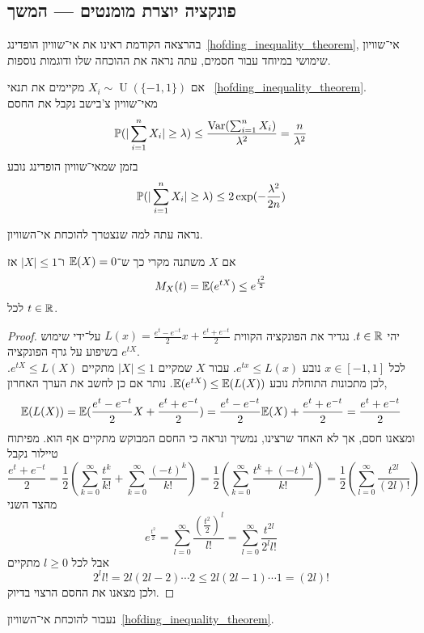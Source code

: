 \subsection{פונקציה יוצרת מומנטים --- המשך}
בהרצאה הקודמת ראינו את אי־שוויון הופדינג\ \ref{hofding_inequality_theorem}, אי־שוויון שימושי במיוחד עבור חסמים, עתה נראה את ההוכחה שלו ודוגמות נוספות.
\begin{example}
	אם $X_i \sim \operatorname{U}(\{-1, 1\})$ מקיימים את תנאי \ \ref{hofding_inequality_theorem}. \\
	מאי־שוויון צ'בישב נקבל את החסם
	\[
		\mathbb{P}(| \sum_{i = 1}^{n} X_i | \ge \lambda)
		\le \frac{\operatorname{Var}(\sum_{i = 1}^{n} X_i)}{\lambda^2}
		= \frac{n}{\lambda^2}
	\]
	בזמן שמאי־שוויון הופדינג נובע
	\[
		\mathbb{P}(| \sum_{i = 1}^{n} X_i | \ge \lambda)
		\le 2 \exp(- \frac{\lambda^2}{2n})
	\]
\end{example}
נראה עתה למה שנצטרך להוכחת אי־השוויון.
\begin{lemma}
	אם $X$ משתנה מקרי כך ש־$\mathbb{E}(X) = 0$ ו־$|X| \le 1$ אז
	\[
		M_X(t)
		= \mathbb{E}(e^{tX})
		\le e^{\frac{t^2}{2}}
	\]
	לכל $t \in \mathbb{R}$.
\end{lemma}
\begin{proof}
	יהי $t \in \mathbb{R}$.
	נגדיר את הפונקציה הקווית $L(x) = \frac{e^t - e^{-t}}{2} x + \frac{e^t + e^{-t}}{2}$ על־ידי שימוש בשיפוע על גרף הפונקציה $e^{tX}$. \\
	לכל $x \in [-1, 1]$ נובע $e^{tx} \le L(x)$.
	עבור $X$ שמקיים $|X| \le 1$ מתקיים $e^{tX} \le L(X)$.
	לכן מתכונות התוחלת נובע $\mathbb{E}(e^{tX}) \le \mathbb{E}(L(X))$.
	נותר אם כן לחשב את הערך האחרון,
	\[
		\mathbb{E}(L(X))
		= \mathbb{E}(\frac{e^t - e^{-t}}{2} X + \frac{e^t + e^{-t}}{2})
		= \frac{e^t - e^{-t}}{2} \mathbb{E}(X) + \frac{e^t + e^{-t}}{2}
		= \frac{e^t + e^{-t}}{2}
	\]
	ומצאנו חסם, אך לא האחד שרצינו, נמשיך ונראה כי החסם המבוקש מתקיים אף הוא.
	מפיתוח טיילור נקבל
	\[
		\frac{e^t + e^{-t}}{2}
		= \frac{1}{2} \left(\sum_{k = 0}^{\infty} \frac{t^k}{k!} + \sum_{k = 0}^{\infty} \frac{{(-t)}^k}{k!} \right)
		= \frac{1}{2} \left(\sum_{k = 0}^{\infty} \frac{t^k + {(-t)}^k}{k!}\right)
		= \frac{1}{2} \left(\sum_{l = 0}^{\infty} \frac{t^{2l}}{(2l)!}\right)
	\]
	מהצד השני
	\[
		e^{\frac{t^2}{2}}
		= \sum_{l = 0}^{\infty} \frac{{\left(\frac{t^2}{2}\right)}^l}{l!}
		= \sum_{l = 0}^{\infty} \frac{t^{2l}}{2^l l!}
	\]
	אבל לכל $l \ge 0$ מתקיים
	\[
		2^l l! = 2l (2l - 2) \cdots 2 \le 2 l (2l - 1) \cdots 1 = (2l)!
	\]
	ולכן מצאנו את החסם הרצוי בדיוק.
\end{proof}
נעבור להוכחת אי־השוויון\ \ref{hofding_inequality_theorem}.
